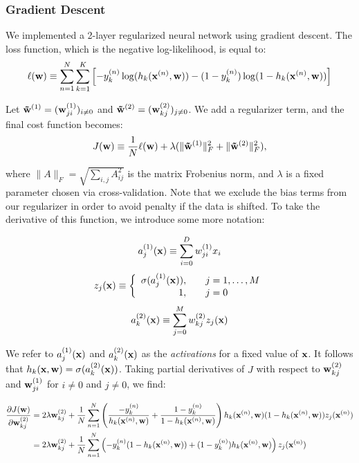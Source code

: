 \subsubsection{Gradient Descent}
We implemented a 2-layer regularized neural network using gradient descent.  The loss function, which is the negative log-likelihood, is equal to:
\begin{equation}
\ell(\boldsymbol{\mathbf{w}}) \equiv \sum_{n=1}^{N} \sum_{k=1}^{K} \left[ -y_k^{(n)} \log(h_{k}(\boldsymbol{\mathbf{x}}^{(n)}, \boldsymbol{\mathbf{w}})) - (1-y_k^{(n)}) \log(1 - h_{k}(\boldsymbol{\mathbf{x}}^{(n)}, \boldsymbol{\mathbf{w}}))\right]
\end{equation}

Let $\boldsymbol{\mathbf{\tilde w}}^{(1)} = (\boldsymbol{\mathbf{w}}^{(1)}_{ji})_{i \neq 0}$ and $\boldsymbol{\mathbf{\tilde w}}^{(2)} = (\boldsymbol{\mathbf{w}}^{(2)}_{kj})_{j \neq 0}$. We add a regularizer term, and the final cost function becomes:
\begin{equation}
J(\boldsymbol{\mathbf{w}}) \equiv \frac{1}{N}\ell(\boldsymbol{\mathbf{w}}) + \lambda(\|\boldsymbol{\mathbf{\tilde w}}^{(1)}\|^2_F + \|\boldsymbol{\mathbf{\tilde w}}^{(2)}\|^2_F),
\end{equation}

where $\|A\|_F = \sqrt{\sum_{i,j} A^2_{ij}}$ is the matrix Frobenius norm, and $\lambda$ is a fixed parameter chosen via cross-validation.  Note that we exclude the bias terms from our regularizer in order to avoid penalty if the data is shifted.  To take the derivative of this function, we introduce some more notation:

\begin{equation}
a^{(1)}_j(\boldsymbol{\mathbf{x}}) \equiv \sum_{i=0}^D w_{ji}^{(1)} x_i
\end{equation}
\begin{equation}
z_j(\boldsymbol{\mathbf{x}}) \equiv \left\{\begin{array}{rl}
\sigma(a^{(1)}_j(\boldsymbol{\mathbf{x}})), & ~~~ j = 1,\ldots, M\\
1, & ~~~j = 0 \end{array} \right.
\end{equation}
\begin{equation}
a^{(2)}_k(\boldsymbol{\mathbf{x}}) \equiv \sum_{j=0}^M w_{kj}^{(2)} z_j(\boldsymbol{\mathbf{x}})
\end{equation}

We refer to $a^{(1)}_j(\boldsymbol{\mathbf{x}})$ and $a^{(2)}_k(\boldsymbol{\mathbf{x}})$ as the \emph{activations} for a fixed value of $\boldsymbol{\mathbf{x}}$.  It follows that $h_{k}(\boldsymbol{\mathbf{x}},\boldsymbol{\mathbf{w}}) = \sigma(a^{(2)}_k(\boldsymbol{\mathbf{x}}))$. Taking partial derivatives of $J$ with respect to $\boldsymbol{\mathbf{w}}^{(2)}_{kj}$ and $\boldsymbol{\mathbf{w}}^{(1)}_{ji}$ for $i \neq 0$ and $j \neq 0$, we find:  

\begin{align}
\frac{\partial J(\boldsymbol{\mathbf{w}})}{\partial \boldsymbol{\mathbf{w}}^{(2)}_{kj}} &= 2 \lambda \boldsymbol{\mathbf{w}}^{(2)}_{kj} + \frac{1}{N}\sum_{n=1}^{N} \left(\frac{-y_k^{(n)}}{h_k(\boldsymbol{\mathbf{x}}^{(n)},\boldsymbol{\mathbf{w}})} +  \frac{1-y_k^{(n)}}{1 - h_k(\boldsymbol{\mathbf{x}}^{(n)},\boldsymbol{\mathbf{w}})}\right) h_k(\boldsymbol{\mathbf{x}}^{(n)},\boldsymbol{\mathbf{w}}) (1 - h_k(\boldsymbol{\mathbf{x}}^{(n)},\boldsymbol{\mathbf{w}})) z_j(\boldsymbol{\mathbf{x}}^{(n)})\\
&= 2 \lambda \boldsymbol{\mathbf{w}}^{(2)}_{kj} +  \frac{1}{N}\sum_{n=1}^{N} \left(-y_k^{(n)}(1 - h_k(\boldsymbol{\mathbf{x}}^{(n)},\boldsymbol{\mathbf{w}})) + (1-y_k^{(n)})h_k(\boldsymbol{\mathbf{x}}^{(n)},\boldsymbol{\mathbf{w}}) \right) z_j(\boldsymbol{\mathbf{x}}^{(n)})
\end{align}

